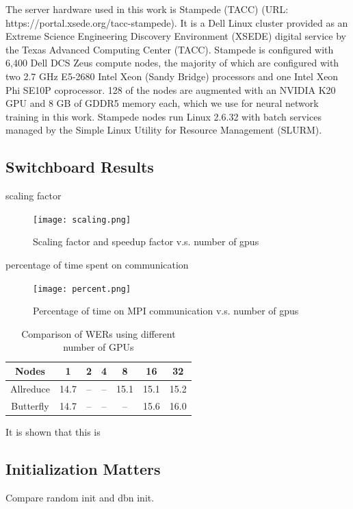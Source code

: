 \documentclass{article}
\begin{document}
The server hardware used in this work is Stampede (TACC) (URL: https://portal.xsede.org/tacc-stampede). It is a Dell Linux 
cluster provided as an Extreme Science Engineering Discovery Environment (XSEDE) digital service by the Texas Advanced 
Computing Center (TACC). Stampede is configured with 6,400 Dell DCS Zeus compute nodes, the majority of which are configured
with two 2.7 GHz E5-2680 Intel Xeon (Sandy Bridge) processors and one Intel Xeon Phi SE10P coprocessor. 128 of the nodes are 
augmented with an NVIDIA K20 GPU and 8 GB of GDDR5 memory each, which we use for neural network training in this work.
Stampede nodes run Linux 2.6.32 with batch services managed by the Simple Linux Utility for Resource Management (SLURM).

\subsection{Switchboard Results}
scaling factor
\begin{figure}[htb]
  \centering
  \texttt{[image: scaling.png]}
  \caption{Scaling factor and speedup factor v.s. number of gpus}
  \label{fig:scaling}
\end{figure}

percentage of time spent on communication
\begin{figure}[htb]
  \centering
  \texttt{[image: percent.png]}
  \caption{Percentage of time on MPI communication v.s. number of gpus}
  \label{fig:percent}
\end{figure}

\begin{table}
  \centering
  \begin{tabular}{c|c|c|c|c|c|c}
    \hline
     Nodes  & 1    & 2    & 4    & 8    & 16 & 32\\
    \hline
Allreduce &    14.7 & -- & -- & 15.1 & 15.1   & 15.2\\
    \hline
Butterfly &    14.7 & -- & -- & --   & 15.6   & 16.0\\
    \hline
  \end{tabular}
  \caption{Comparison of WERs using different number of GPUs }
  \label{tab:wer}
\end{table}

It is shown that this is

\subsection{Initialization Matters}
\label{sec:init}
Compare random init and dbn init.
\end{document}
